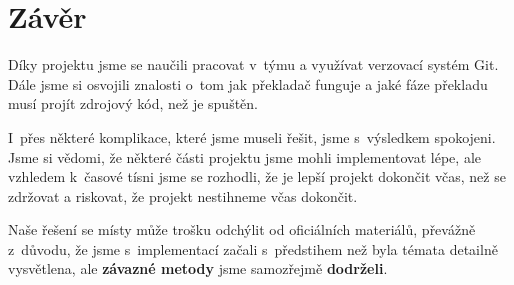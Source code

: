 \documentclass[a4paper, 11pt]{article}
\begin{document}
	\section{Závěr}
	Díky projektu jsme se naučili pracovat v~týmu a využívat verzovací systém Git. Dále jsme si osvojili znalosti o~tom jak překladač funguje a jaké fáze překladu musí projít zdrojový kód, než je spuštěn.
	\par\noindent I~přes některé komplikace, které jsme museli řešit, jsme s~výsledkem spokojeni. Jsme si vědomi, že některé části projektu jsme mohli implementovat lépe, ale vzhledem k~časové tísni jsme se rozhodli, že je lepší projekt dokončit včas, než se zdržovat a riskovat, že projekt nestihneme včas dokončit.
	\par\noindent Naše řešení se místy může trošku odchýlit od oficiálních materiálů, převážně z~důvodu, že jsme s~implementací začali s~předstihem než byla témata detailně vysvětlena, ale \textbf{závazné metody} jsme samozřejmě \textbf{dodrželi}.
	

	\newpage
	
	\renewcommand{\refname}{Literatura}
	



	\newpage
\end{document}
